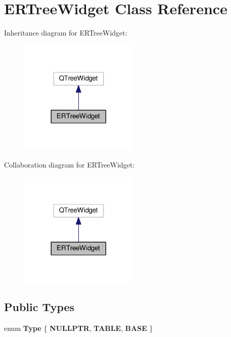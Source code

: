 \hypertarget{classERTreeWidget}{}\section{E\+R\+Tree\+Widget Class Reference}
\label{classERTreeWidget}


Inheritance diagram for E\+R\+Tree\+Widget\+:\nopagebreak
\begin{figure}[H]
\begin{center}
\leavevmode
\includegraphics[width=161pt]{classERTreeWidget__inherit__graph}
\end{center}
\end{figure}


Collaboration diagram for E\+R\+Tree\+Widget\+:\nopagebreak
\begin{figure}[H]
\begin{center}
\leavevmode
\includegraphics[width=161pt]{classERTreeWidget__coll__graph}
\end{center}
\end{figure}
\subsection*{Public Types}
\begin{DoxyCompactItemize}
\item 
enum {\bfseries Type} \{ {\bfseries N\+U\+L\+L\+P\+TR}, 
{\bfseries T\+A\+B\+LE}, 
{\bfseries B\+A\+SE}
 \}\hypertarget{classERTreeWidget_a45164f300024715be7e05e0424cf3978}{}\label{classERTreeWidget_a45164f300024715be7e05e0424cf3978}

\end{DoxyCompactItemize}
